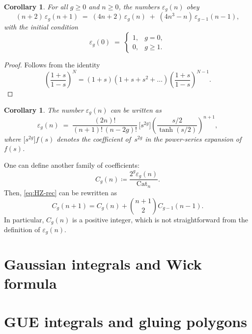 \documentclass[letterpaper,11pt,oneside,reqno]{article}
\numberwithin{equation}{section}
\newtheorem{corollary}[proposition]{Corollary}
\theoremstyle{definition}
\begin{document}
\begin{corollary}\label{cor:HZ-recurrence} %
For all $g\ge 0$ and $n\ge 0$, the numbers $\varepsilon_g(n)$ obey
\begin{equation}\label{eq:HZ-rec} %
  (n+2)\,\varepsilon_g(n+1)
  \;=\;
  (4n+2)\,\varepsilon_g(n)
  \;+\;
  (4n^{3}-n)\,\varepsilon_{g-1}(n-1),
\end{equation}
with the initial condition
\[
  \varepsilon_g(0)
  \;=\;
  \begin{cases}
    1,& g=0,\\[4pt]
    0,& g\ge 1.
  \end{cases}
\]
\end{corollary}
\begin{proof}
	Follows from the identity
	\begin{equation*}
		\left( \frac{1+s}{1-s} \right)^{N}=
		(1+s)(1+s+s^2+\ldots )\left( \frac{1+s}{1-s} \right)^{N-1}.
	\end{equation*}
\end{proof}

\begin{corollary}\label{cor:epsg-explicit}
The number $\varepsilon_g(n)$ can be written as  
\[
\varepsilon_g(n)\;=\;\frac{(2n)!}{(n+1)!\,(n-2g)!}\,
\bigl[s^{2g}\bigr]\!
\left(\frac{s/2}{\tanh(s/2)}\right)^{n+1},
\]
where $\bigl[s^{2g}\bigr]f(s)$ denotes the coefficient of $s^{2g}$ in the power‑series expansion of $f(s)$.
\end{corollary}



One can define another family of coefficients:
\begin{equation*}
	C_g(n)\coloneqq \frac{2^g \varepsilon_g(n)}{\mathrm{Cat}_n}.
\end{equation*}
Then, \eqref{eq:HZ-rec} can be rewritten as
\begin{equation*}
	C_g(n+1)=C_g(n)+\binom{n+1}2 C_{g-1}(n-1).
\end{equation*}
In particular, $C_g(n)$ is a positive integer, which is not straightforward from the 
definition of $\varepsilon_g(n)$.



\section{Gaussian integrals and Wick formula}



\section{GUE integrals and gluing polygons}
\end{document}
